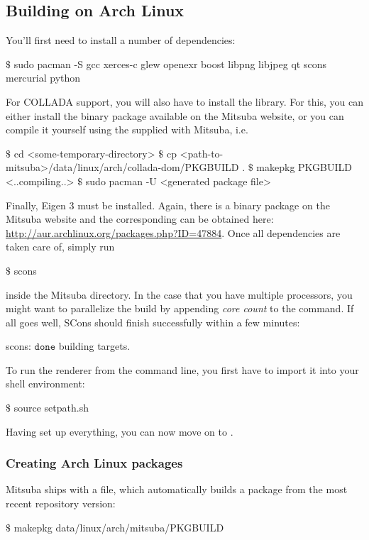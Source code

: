 \subsection{Building on Arch Linux}
You'll first need to install a number of dependencies:
\begin{shell}
$\text{\$}$ sudo pacman -S gcc xerces-c glew openexr boost libpng libjpeg qt scons mercurial python
\end{shell}
For COLLADA support, you will also have to install the 
library. For this, you can either install the binary package available on
the Mitsuba website, or you can compile it yourself using the 
supplied with Mitsuba, i.e.
\begin{shell}
$\text{\$}$ cd <some-temporary-directory>
$\text{\$}$ cp <path-to-mitsuba>/data/linux/arch/collada-dom/PKGBUILD .
$\text{\$}$ makepkg PKGBUILD
<..compiling..>
$\text{\$}$ sudo pacman -U <generated package file>
\end{shell}
Finally, Eigen 3 must be installed. Again, there is a binary package on the
Mitsuba website and the corresponding  can be obtained here:
\url{http://aur.archlinux.org/packages.php?ID=47884}.
Once all dependencies are taken care of, simply run
\begin{shell}
$\text{\$}$ scons
\end{shell}
inside the Mitsuba directory. In the case that you have multiple processors, you might want to parallelize the build by appending \emph{core count} to the command.
If all goes well, SCons should finish successfully within a few minutes:
\begin{shell}
scons: $\texttt{done}$ building targets.
\end{shell}
To run the renderer from the command line, you first have to import it into your shell environment:
\begin{shell}
$\text{\$}$ source setpath.sh
\end{shell}

Having set up everything, you can now move on to .
\subsubsection{Creating Arch Linux packages}
Mitsuba ships with a  file, which automatically builds
a package from the most recent repository version:
\begin{shell}
$\text{\$}$ makepkg data/linux/arch/mitsuba/PKGBUILD
\end{shell}

